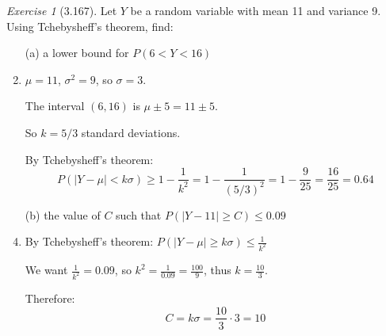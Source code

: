 \documentclass[12pt]{amsart}
\makeatletter
\theoremstyle{remark}
\newtheorem*{exercise}{Exercise}%
\renewenvironment{proof}[1][\proofname]{\par\doublespacing
  \pushQED{\qed}%
  \normalfont \topsep6\p@\@plus6\p@\relax
  \list{}{%
    \settowidth{\leftmargin}{\itshape\proofname:\hskip\labelsep}%
    \setlength{\labelwidth}{0pt}%
    \setlength{\itemindent}{-\leftmargin}%
  }%
  \item[\hskip\labelsep\itshape#1\@addpunct{:}]\ignorespaces
}{%
  \popQED\endlist\@endpefalse
  \singlespacing
}
\theoremstyle{mycomment}
\makeatother
\begin{document}
\begin{exercise}[3.167]
Let $Y$ be a random variable with mean 11 and variance 9. Using Tchebysheff's theorem, find:

\begin{enumerate}
    \item[(a)] a lower bound for $P(6 < Y < 16)$
\begin{proof}[Solution]
 $\mu = 11$, $\sigma^2 = 9$, so $\sigma = 3$.
	
	The interval $(6, 16)$ is $\mu \pm 5 = 11 \pm 5$.
	
	So $k = 5/3$ standard deviations.
	
	By Tchebysheff's theorem:
	$$P(|Y - \mu| < k\sigma) \geq 1 - \frac{1}{k^2} = 1 - \frac{1}{(5/3)^2} = 1 - \frac{9}{25} = \frac{16}{25} = 0.64$$
\end{proof}
    \item[(b)] the value of $C$ such that $P(|Y - 11| \geq C) \leq 0.09$
\begin{proof}[Solution]
 By Tchebysheff's theorem: $P(|Y - \mu| \geq k\sigma) \leq \frac{1}{k^2}$
	
	We want $\frac{1}{k^2} = 0.09$, so $k^2 = \frac{1}{0.09} = \frac{100}{9}$, thus $k = \frac{10}{3}$.
	
	Therefore:
	$$C = k\sigma = \frac{10}{3} \cdot 3 = 10$$
\end{proof}
\end{enumerate} 
\end{exercise}
\end{document}
